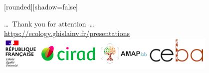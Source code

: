 \documentclass[
  10pt,
  ignorenonframetext,
  table, dvipsname, compress]{beamer}
\begin{document}

{
  [rounded][shadow=false]
  \begin{frame}[plain]
    \begin{block}{}
      \begin{center}
        \ldots~Thank you for attention~\ldots \\
        \url{https://ecology.ghislainv.fr/presentations} \\
        \includegraphics[width=0.8\textwidth]{figs/partners_logos}
      \end{center}
    \end{block}
  \end{frame}
}
\end{document}
